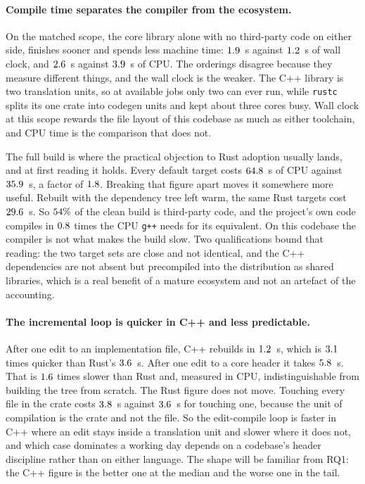 \documentclass[english,oneside,a4paper,censored,csm,software-track-2020]{HYthesisML}
\begin{document}
\paragraph{Compile time separates the compiler from the ecosystem.}
On the matched scope, the core library alone with no third-party code on either side,
\BuildLibWallFaster{} finishes sooner and \BuildLibCpuCheaper{} spends less machine time:
$1.9$~s against $1.2$~s of wall clock, and $2.6$~s against
$3.9$~s of CPU. The orderings disagree because they measure different things, and
the wall clock is the weaker. The C++ library is two translation units, so at
\AdoptJobs{} available jobs only two can ever run, while \texttt{rustc} splits its one crate into
codegen units and kept about three cores busy. Wall clock at this scope rewards the
file layout of this codebase as much as either toolchain, and CPU time is the comparison that
does not.

The full build is where the practical objection to Rust adoption usually lands, and at first
reading it holds. Every default target costs $64.8$~s of CPU against
$35.9$~s, a factor of $1.8$. Breaking that figure apart moves it somewhere
more useful. Rebuilt with the dependency tree left warm, the same Rust targets cost
$29.6$~s. So $54\%$ of the clean build is third-party code, and
the project's own code compiles in $0.8$ times the CPU \texttt{g++} needs
for its equivalent. On this codebase the compiler is not what makes the build slow. Two
qualifications bound that reading: the two target sets are close and not identical, and the C++
dependencies are not absent but precompiled into the distribution as shared libraries, which
is a real benefit of a mature ecosystem and not an artefact of the accounting.

\paragraph{The incremental loop is quicker in C++ and less predictable.}
After one edit to an implementation file, C++ rebuilds in $1.2$~s, which is
$3.1$ times quicker than Rust's $3.6$~s. After one edit to a core header it
takes $5.8$~s. That is $1.6$ times slower than Rust and, measured
in CPU, indistinguishable from building the tree from scratch. The Rust figure does not move.
Touching every file in the crate costs $3.8$~s against $3.6$~s for
touching one, because the unit of compilation is the crate and not the file. So the edit-compile
loop is faster in C++ where an edit stays inside a translation unit and slower where it does not,
and which case dominates a working day depends on a codebase's header discipline rather than on
either language. The shape will be familiar from RQ1: the C++ figure is the better
one at the median and the worse one in the tail.
\end{document}
